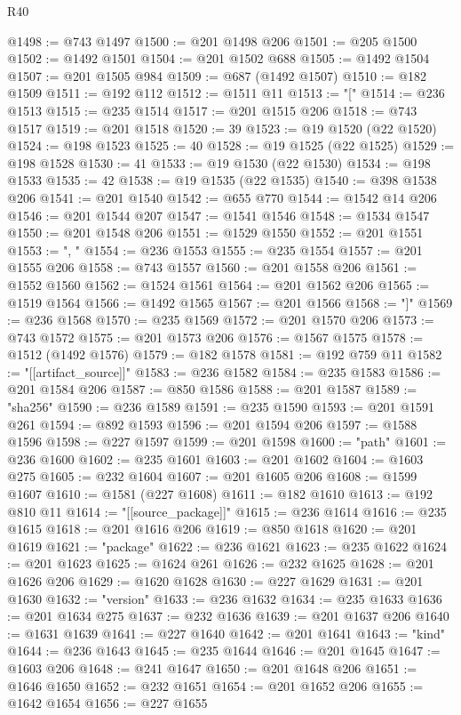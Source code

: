 \begin{lexlean}{R40}
\begin{coremodule}
@1498 := @743 @1497
@1500 := @201 @1498 @206
@1501 := @205 @1500
@1502 := @1492 @1501
@1504 := @201 @1502 @688
@1505 := @1492 @1504
@1507 := @201 @1505 @984
@1509 := @687 (@1492 @1507)
@1510 := @182 @1509
@1511 := @192 @112
@1512 := @1511 @11
@1513 := "["
@1514 := @236 @1513
@1515 := @235 @1514
@1517 := @201 @1515 @206
@1518 := @743 @1517
@1519 := @201 @1518
@1520 := 39
@1523 := @19 @1520 (@22 @1520)
@1524 := @198 @1523
@1525 := 40
@1528 := @19 @1525 (@22 @1525)
@1529 := @198 @1528
@1530 := 41
@1533 := @19 @1530 (@22 @1530)
@1534 := @198 @1533
@1535 := 42
@1538 := @19 @1535 (@22 @1535)
@1540 := @398 @1538 @206
@1541 := @201 @1540
@1542 := @655 @770
@1544 := @1542 @14 @206
@1546 := @201 @1544 @207
@1547 := @1541 @1546
@1548 := @1534 @1547
@1550 := @201 @1548 @206
@1551 := @1529 @1550
@1552 := @201 @1551
@1553 := ", "
@1554 := @236 @1553
@1555 := @235 @1554
@1557 := @201 @1555 @206
@1558 := @743 @1557
@1560 := @201 @1558 @206
@1561 := @1552 @1560
@1562 := @1524 @1561
@1564 := @201 @1562 @206
@1565 := @1519 @1564
@1566 := @1492 @1565
@1567 := @201 @1566
@1568 := "]"
@1569 := @236 @1568
@1570 := @235 @1569
@1572 := @201 @1570 @206
@1573 := @743 @1572
@1575 := @201 @1573 @206
@1576 := @1567 @1575
@1578 := @1512 (@1492 @1576)
@1579 := @182 @1578
@1581 := @192 @759 @11
@1582 := "[[artifact_source]]"
@1583 := @236 @1582
@1584 := @235 @1583
@1586 := @201 @1584 @206
@1587 := @850 @1586
@1588 := @201 @1587
@1589 := "sha256"
@1590 := @236 @1589
@1591 := @235 @1590
@1593 := @201 @1591 @261
@1594 := @892 @1593
@1596 := @201 @1594 @206
@1597 := @1588 @1596
@1598 := @227 @1597
@1599 := @201 @1598
@1600 := "path"
@1601 := @236 @1600
@1602 := @235 @1601
@1603 := @201 @1602
@1604 := @1603 @275
@1605 := @232 @1604
@1607 := @201 @1605 @206
@1608 := @1599 @1607
@1610 := @1581 (@227 @1608)
@1611 := @182 @1610
@1613 := @192 @810 @11
@1614 := "[[source_package]]"
@1615 := @236 @1614
@1616 := @235 @1615
@1618 := @201 @1616 @206
@1619 := @850 @1618
@1620 := @201 @1619
@1621 := "package"
@1622 := @236 @1621
@1623 := @235 @1622
@1624 := @201 @1623
@1625 := @1624 @261
@1626 := @232 @1625
@1628 := @201 @1626 @206
@1629 := @1620 @1628
@1630 := @227 @1629
@1631 := @201 @1630
@1632 := "version"
@1633 := @236 @1632
@1634 := @235 @1633
@1636 := @201 @1634 @275
@1637 := @232 @1636
@1639 := @201 @1637 @206
@1640 := @1631 @1639
@1641 := @227 @1640
@1642 := @201 @1641
@1643 := "kind"
@1644 := @236 @1643
@1645 := @235 @1644
@1646 := @201 @1645
@1647 := @1603 @206
@1648 := @241 @1647
@1650 := @201 @1648 @206
@1651 := @1646 @1650
@1652 := @232 @1651
@1654 := @201 @1652 @206
@1655 := @1642 @1654
@1656 := @227 @1655

\end{coremodule}
\end{lexlean}
